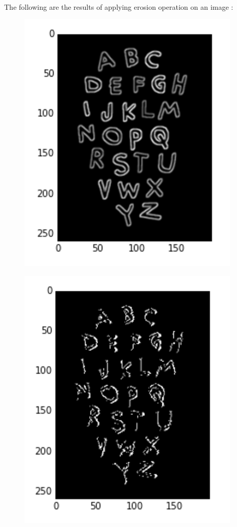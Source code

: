 \documentclass{article}
\begin{document}
		\paragraph{}
		The following are the results of applying erosion operation on an image :
		\begin{figure}[H]
			\begin{minipage}{.5\textwidth}
				\centering
				\includegraphics[width=0.6\linewidth]{images/before_non_maximum_supression.png}
				\label{fig:test16}
			\end{minipage}
			\begin{minipage}{.5\textwidth}
				\centering
				\includegraphics[width=0.6\linewidth]{images/after_non_maximum_supression.png}
				\label{fig:test17}
			\end{minipage}
		\end{figure}
\end{document}
